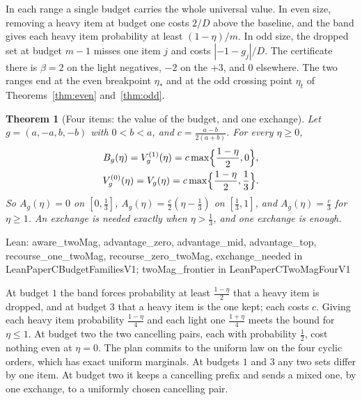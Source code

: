 \documentclass[conference]{IEEEtran}
\newtheorem{theorem}{Theorem}
\theoremstyle{definition}
\newcommand{\lean}[1]{\textsf{\footnotesize #1}}
\newcommand{\leanbox}[1]{%
  \par\vspace{2pt}\noindent
  {\raggedright\footnotesize\textsf{Lean: #1}\par}\vspace{2pt}}
\begin{document}
In each range a single budget carries the whole universal value. In even size, removing a heavy
item at budget one costs $2/D$ above the baseline, and the band gives each heavy item
probability at least $(1-\eta)/m$. In odd size, the dropped set at budget $m-1$ misses one item
$j$ and costs $|-1-g_{j}|/D$. The certificate there is $\beta=2$ on the light negatives, $-2$ on
the $+3$, and $0$ elsewhere. The two ranges end at the even breakpoint $\eta_*$ and at the odd
crossing point $\eta_t$ of Theorems~\ref{thm:even} and~\ref{thm:odd}.

\begin{theorem}[Four items: the value of the budget, and one exchange]
\label{thm:fourrecourse}
Let $g=(a,-a,b,-b)$ with $0<b<a$, and $c=\frac{a-b}{2(a+b)}$. For every $\eta\ge0$,
\begin{gather*}
B_{g}(\eta)=V^{(1)}_{g}(\eta)=c\max\Bigl\{\frac{1-\eta}2,0\Bigr\},\\
V^{(0)}_{g}(\eta)=V_{g}(\eta)=c\max\Bigl\{\frac{1-\eta}2,\frac13\Bigr\}.
\end{gather*}
So $A_{g}(\eta)=0$ on $[0,\frac13]$, $A_g(\eta)=\frac c2(\eta-\frac13)$ on $[\frac13,1]$, and
$A_g(\eta)=\frac c3$ for $\eta\ge1$. An exchange is needed exactly when $\eta>\frac13$, and one
exchange is enough.
\end{theorem}
\leanbox{\lean{aware\_twoMag}, \lean{advantage\_zero}, \lean{advantage\_mid},
\lean{advantage\_top}, \lean{recourse\_one\_twoMag}, \lean{recourse\_zero\_twoMag},
\lean{exchange\_needed} in \lean{LeanPaperCBudgetFamiliesV1}; \lean{twoMag\_frontier} in
\lean{LeanPaperCTwoMagFourV1}}

At budget $1$ the band forces probability at least $\frac{1-\eta}2$ that a heavy item is dropped,
and at budget $3$ that a heavy item is the one kept; each costs $c$. Giving each heavy item
probability $\frac{1-\eta}4$ and each light one $\frac{1+\eta}4$ meets the bound for $\eta\le1$. At budget two
the two cancelling pairs, each with probability $\frac12$, cost nothing even at $\eta=0$. The
plan commits to the uniform law on the four cyclic orders, which has exact uniform marginals.
At budgets $1$ and $3$ any two sets differ by one item. At budget two it keeps a cancelling
prefix and sends a mixed one, by one exchange, to a uniformly chosen cancelling pair.
\end{document}
